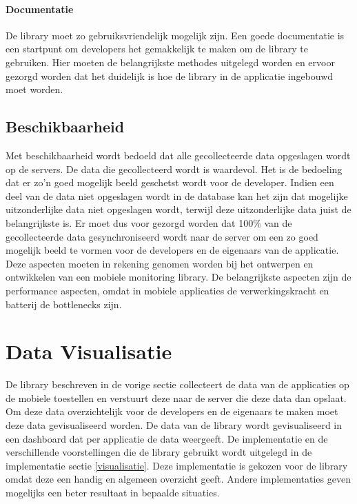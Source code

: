 \paragraph{Documentatie} De library moet zo gebruiksvriendelijk mogelijk zijn. Een goede documentatie is een startpunt om developers het gemakkelijk te maken om de library te gebruiken. Hier moeten de belangrijkste methodes uitgelegd worden en ervoor gezorgd worden dat het duidelijk is hoe de library in de applicatie ingebouwd moet worden. 



\subsection{Beschikbaarheid}
Met beschikbaarheid wordt bedoeld dat alle gecollecteerde data opgeslagen wordt op de servers. De data die gecollecteerd wordt is waardevol. Het is de bedoeling dat er zo'n goed mogelijk beeld geschetst wordt voor de developer. Indien een deel van de data niet opgeslagen wordt in de database kan het zijn dat mogelijke uitzonderlijke data niet opgeslagen wordt, terwijl deze uitzonderlijke data juist de belangrijkste is. Er moet dus voor gezorgd worden dat 100\% van de gecollecteerde data gesynchroniseerd wordt naar de server om een zo goed mogelijk beeld te vormen voor de developers en de eigenaars van de applicatie.\\


Deze aspecten moeten in rekening genomen worden bij het ontwerpen en ontwikkelen van een mobiele monitoring library. De belangrijkste aspecten zijn de performance aspecten, omdat in mobiele applicaties de verwerkingskracht en batterij de bottlenecks zijn. 


\section{Data Visualisatie}
De library beschreven in de vorige sectie collecteert de data van de applicaties op de mobiele toestellen en verstuurt deze naar de server die deze data dan opslaat. Om deze data overzichtelijk voor de developers en de eigenaars te maken moet deze data gevisualiseerd worden. De data van de library wordt gevisualiseerd in een dashboard dat per applicatie de data weergeeft. De implementatie en de verschillende voorstellingen die de library gebruikt wordt uitgelegd in de implementatie sectie \ref{visualisatie}. Deze implementatie is gekozen voor de library omdat deze een handig en algemeen overzicht geeft. Andere implementaties geven mogelijks een beter resultaat in bepaalde situaties. 

